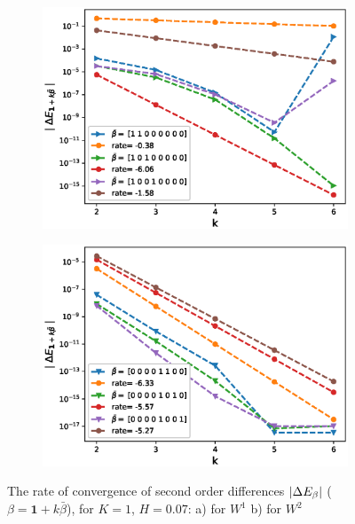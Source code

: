 \documentclass[11pt]{article}
\begin{document}
	
	\begin{figure}[h!]
		\centering
		\begin{subfigure}{.4\textwidth}
			\centering
			\includegraphics[width=1\linewidth]{./figures/rBergomi_mixed_error_rates/without_change_measure/N_4/H_007/mixed_difference_order2_rbergomi_4steps_H_007_K_1_totally_hierarch_with_rate_W1}
			\caption{}
			\label{fig:sub3}
		\end{subfigure}%
		\begin{subfigure}{.4\textwidth}
			\centering
			\includegraphics[width=1\linewidth]{./figures/rBergomi_mixed_error_rates/without_change_measure/N_4/H_007/mixed_difference_order2_rbergomi_4steps_H_007_K_1_totally_hierarch_with_rate_W2}
			\caption{}
			\label{fig:sub4}
		\end{subfigure}
		
		\caption{The rate of convergence of  second order differences $\left\lvert\Delta E_{\beta}\right\rvert$ ($\beta=\mathbf{1}+k \bar{\beta}$), for $K=1$, $H=0.07$: a) for $W^1$ b) for $W^2$}
		\label{fig:second_diff_comp_K_1_H_007_wihtout_change_measure}
	\end{figure}
	
\end{document}
